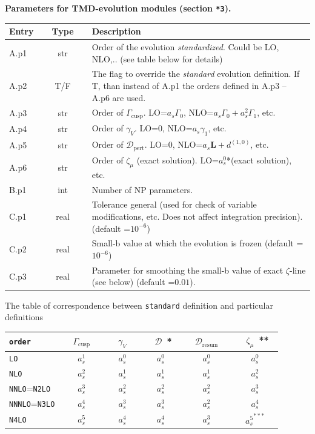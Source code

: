 \documentclass[prd,nofootinbib,eqsecnum,final]{revtex4}
\renewcommand{\(}{\left(}
\renewcommand{\)}{\right)}
\renewcommand{\[}{\left[}
\renewcommand{\]}{\right]}
\begin{document}
\begin{center}
\textbf{Parameters for TMD-evolution modules (section \texttt{*3}).} 
\\
\begin{tabular}{||p{1.5cm}||c||p{12.5cm}||}
\hline\hline
Entry &~~Type~~& Description
\\\hline
A.p1 & str & Order of the evolution \textit{standardized}. Could be LO, NLO,.. (see table below for details)
\\\hline
A.p2 & T/F & The flag to override the \textit{standard} evolution definition. If T, than instead of A.p1 the orders defined in A.p3 -- A.p6 are used.
\\\hline
A.p3 & str & Order of $\Gamma_{\text{cusp}}$. LO=$a_s \Gamma_0$, NLO=$a_s \Gamma_0+a_s^2\Gamma_1$, etc.
\\\hline
A.p4 & str & Order of $\gamma_{V}$. LO=0, NLO=$a_s \gamma_1$, etc.
\\\hline
A.p5 & str & Order of $\mathcal{D}_{\text{pert}}$. LO=0, NLO=$a_s \mathbf{L}+d^{(1,0)}$, etc.
\\\hline
A.p6 & str & Order of $\zeta_\mu$ (exact solution). LO=$a_s^0$*(exact solution),  etc.
\\\hline\hline
B.p1 & int & Number of NP parameters.
\\\hline\hline
C.p1 & real & Tolerance general (used for check of variable modifications, etc. Does not affect integration precision). (default =$10^{-6}$)
\\\hline
C.p2 & real & Small-b value at which the evolution is frozen (default =$10^{-6}$)
\\\hline
C.p3 & real & Parameter for smoothing the small-b value of exact $\zeta$-line (see below) (default =$0.01$).
\\\hline\hline
\end{tabular}
\end{center}

\begin{center}
The table of correspondence between \texttt{standard} definition and particular definitions
\begin{tabular}{|l||c|c|c||c|| c|}
\texttt{order}~~~ & ~~$\Gamma_{\text{cusp}}$~~ & ~~$\gamma_V$~~ & ~~$\mathcal{D}$~*~ & ~~$\mathcal{D}_{\text{resum}}$~~ & ~~$\zeta_\mu$~**~
\\\hline\hline
\texttt{LO} & $a_s^1$ & $a_s^0$ & $a_s^0$ & $a_s^0$ & $a_s^0$ 
\\\hline
\texttt{NLO} & $a_s^2$ & $a_s^1$ & $a_s^1$ & $a_s^1$ & $a_s^2$ 
\\\hline
\texttt{NNLO}=\texttt{N2LO} & $a_s^3$ & $a_s^2$ & $a_s^2$ & $a_s^2$ & $a_s^3$ 
\\\hline
\texttt{NNNLO}=\texttt{N3LO} & $a_s^4$ & $a_s^3$ & $a_s^3$ & $a_s^2$ & $a_s^4$ 
\\\hline
\texttt{N4LO} & $a_s^5$ & $a_s^4$ & $a_s^4$ & $a_s^3$ & ${a_s^5}^{***}$ 
\\\hline
\end{tabular}
\end{center}
\end{document}
